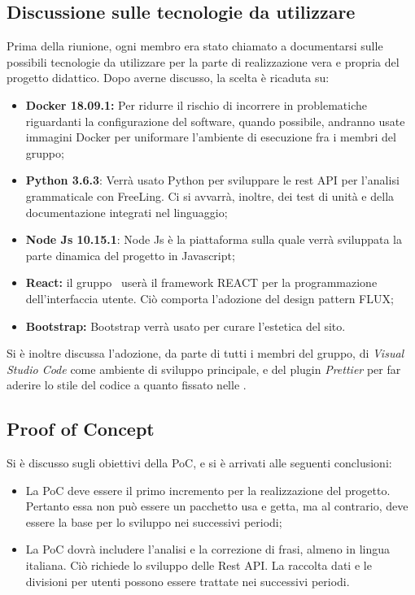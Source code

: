 \documentclass[a4paper, oneside, openany, dvipsnames, table]{article}
\begin{document}
\subsection{Discussione sulle tecnologie da utilizzare}
Prima della riunione, ogni membro era stato chiamato a documentarsi sulle possibili tecnologie da utilizzare per la parte di realizzazione vera e propria del progetto didattico. Dopo averne discusso, la scelta è ricaduta su:
\begin{itemize}
	\item \textbf{Docker 18.09.1:} Per ridurre il rischio di incorrere in problematiche riguardanti la configurazione del software, quando possibile, andranno usate immagini Docker per uniformare l'ambiente di esecuzione fra i membri del gruppo;
	\item \textbf{Python 3.6.3}: Verrà usato Python per sviluppare le rest API per l'analisi grammaticale con FreeLing. Ci si avvarrà, inoltre, dei test di unità e della documentazione integrati nel linguaggio;
	\item \textbf{Node Js 10.15.1}: Node Js è la piattaforma sulla quale verrà sviluppata la parte dinamica del progetto in Javascript;
	\item \textbf{React:} il gruppo \gruppo \ userà il framework REACT per la programmazione dell'interfaccia utente. Ciò comporta l'adozione del design pattern FLUX;
	\item \textbf{Bootstrap:} Bootstrap verrà usato per curare l'estetica del sito.
\end{itemize}

Si è inoltre discussa l'adozione, da parte di tutti i membri del gruppo, di \textit{Visual Studio Code} come ambiente di sviluppo principale, e del plugin \textit{Prettier} per far aderire lo stile del codice a quanto fissato nelle \NdP .

\subsection{Proof of Concept}
Si è discusso sugli obiettivi della PoC, e si è arrivati alle seguenti conclusioni:
\begin{itemize}
	\item La PoC deve essere il primo incremento per la realizzazione del progetto. Pertanto essa non può essere un pacchetto usa e getta, ma al contrario, deve essere la base per lo sviluppo nei successivi periodi;
	\item La PoC dovrà includere l'analisi e la correzione di frasi, almeno in lingua italiana. Ciò richiede lo sviluppo delle Rest API. La raccolta dati e le divisioni per utenti possono essere trattate nei successivi periodi.
\end{itemize}
	
\end{document}
